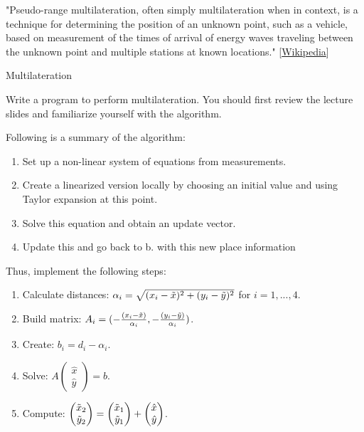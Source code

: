 \documentclass[twoside]{article}
\begin{document}
\maketitle

\vspace{10pt}

"Pseudo-range multilateration, often simply multilateration when in context, is a technique for determining the position of an unknown point, such as a vehicle, based on measurement of the times of arrival of energy waves traveling between the unknown point and multiple stations at known locations." [\href{https://en.wikipedia.org/wiki/Pseudo-range\_multilateration}{Wikipedia}]

\begin{task}{Multilateration}{}{}

Write a program to perform multilateration.
You should first review the lecture slides and familiarize yourself with the algorithm.
\vspace{10pt}

\noindent Following is a summary of the algorithm:
\begin{enumerate}
    \item Set up a non-linear system of equations from measurements.
    \item Create a linearized version locally by choosing an initial value and using Taylor expansion at this point.
    \item Solve this equation and obtain an update vector.
    \item Update this and go back to b. with this new place information
\end{enumerate}
\vspace{5pt}
Thus, implement the following steps:
\begin{enumerate}
    \item Calculate distances:
$\alpha_{i}=\sqrt{(x_{i}-\Tilde{x})^2+(y_{i}-\Tilde{y})^2}$ for $i = 1, ..., 4$.
    \item Build matrix:
$A_{i}=(-\frac{(x_{i}-\Tilde{x})}{\alpha_{i}}, -\frac{(y_{i}-\Tilde{y})}{\alpha_{i}})$.
    \item Create: $b_{i}=d_{i}-\alpha_{i}$.
    \item Solve: $A\begin{pmatrix}\hat{x}\\\hat{y}\end{pmatrix}=b$.
    \item Compute: $\begin{pmatrix}\Tilde{x}_{2}\\\Tilde{y}_{2}\end{pmatrix}= \begin{pmatrix}\Tilde{x}_{1}\\\Tilde{y}_{1}\end{pmatrix} + \begin{pmatrix}\hat{x}\\\hat{y}\end{pmatrix}$.
\end{enumerate}


\end{task}
\end{document}
